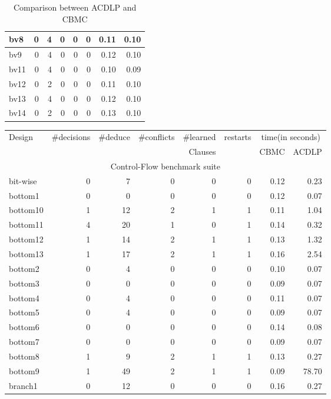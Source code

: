 \documentclass{article}
\begin{document}
\begin{table}[!b]
\begin{center}
{\begin{tabular}{l|r|r|r|r|r|r|r}
  bv8 & 0 & 4 & 0 & 0 & 0 & 0.11 & 0.10 \\ \hline
  bv9 & 0 & 4 & 0 & 0 & 0 & 0.12 & 0.10 \\ \hline
  bv11 & 0 & 4 & 0 & 0 & 0 & 0.10 & 0.09 \\ \hline
  bv12 & 0 & 2 & 0 & 0 & 0 & 0.11 & 0.10 \\ \hline
  bv13 & 0 & 4 & 0 & 0 & 0 & 0.12 & 0.10 \\ \hline
  bv14 & 0 & 2 & 0 & 0 & 0 & 0.13 & 0.10 \\ \hline
\end{tabular}
}
\end{center}
\caption{Comparison between ACDLP and CBMC}
\label{solver2}
\end{table}


\begin{table}[!b]
\begin{center}
{
\begin{tabular}{l|r|r|r|r|r|r|r}
\hline
  Design & \#decisions & \#deduce & \#conflicts & \#learned  &
  restarts & \multicolumn{2}{c}{time(in seconds)} \\ 
  \cline{7-8}
  & & & & Clauses & & CBMC & ACDLP \\ \hline
  \multicolumn{8}{c}{Control-Flow benchmark suite} \\ \hline 
  bit-wise&0&7&0&0&0&0.12 & 0.23
  \\ \hline 
  bottom1&0&0&0&0&0&0.12 & 0.07
  \\ \hline 
  bottom10&1&12&2&1&1&0.11 & 1.04
  \\ \hline 
  bottom11&4&20&1&0&1&0.14 & 0.32
  \\ \hline 
  bottom12&1&14&2&1&1&0.13 & 1.32
  \\ \hline 
  bottom13&1&17&2&1&1&0.16 & 2.54
  \\ \hline 
  bottom2&0&4&0&0&0&0.10 & 0.07
  \\ \hline 
  bottom3&0&0&0&0&0&0.09 & 0.07
  \\ \hline 
  bottom4&0&4&0&0&0&0.11 & 0.07
  \\ \hline 
  bottom5&0&4&0&0&0&0.09 & 0.07
  \\ \hline 
  bottom6&0&0&0&0&0&0.14 & 0.08
  \\ \hline 
  bottom7&0&0&0&0&0&0.09 & 0.07
  \\ \hline 
  bottom8&1&9&2&1&1&0.13 & 0.27
  \\ \hline 
  bottom9&1&49&2&1&1&0.09 & 78.70
  \\ \hline 
  branch1&0&12&0&0&0&0.16 & 0.27
  \\ \hline 

\end{tabular}}
\end{center}
\end{table}
\end{document}
